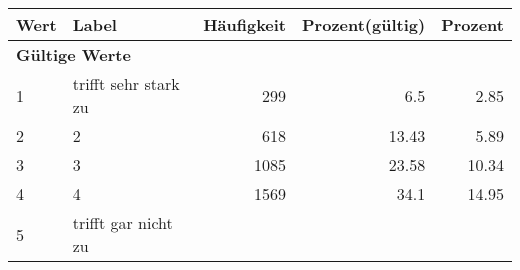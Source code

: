      \begin{longtable}{lXrrr}
     \toprule
     \textbf{Wert} & \textbf{Label} & \textbf{Häufigkeit} & \textbf{Prozent(gültig)} & \textbf{Prozent} \\
     \endhead
     \midrule
     \multicolumn{5}{l}{\textbf{Gültige Werte}}\\

     1 &
     \multicolumn{1}{X}{ trifft sehr stark zu   } &


       \num{299} &
       \num[round-mode=places,round-precision=2]{6,5} &
         \num[round-mode=places,round-precision=2]{2,85} \\

     2 &
     \multicolumn{1}{X}{ 2   } &


       \num{618} &
       \num[round-mode=places,round-precision=2]{13,43} &
         \num[round-mode=places,round-precision=2]{5,89} \\

     3 &
     \multicolumn{1}{X}{ 3   } &


       \num{1085} &
       \num[round-mode=places,round-precision=2]{23,58} &
         \num[round-mode=places,round-precision=2]{10,34} \\

     4 &
     \multicolumn{1}{X}{ 4   } &


       \num{1569} &
       \num[round-mode=places,round-precision=2]{34,1} &
         \num[round-mode=places,round-precision=2]{14,95} \\

     5 &
     \multicolumn{1}{X}{ trifft gar nicht zu   } &



\end{longtable}
